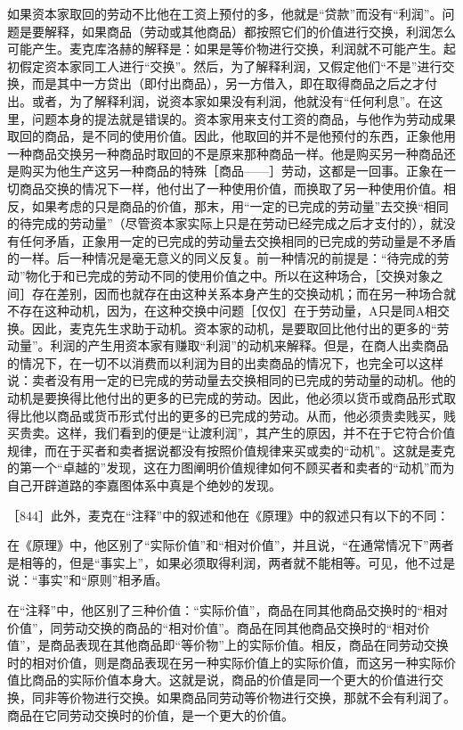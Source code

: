 如果资本家取回的劳动不比他在工资上预付的多，他就是“贷款”而没有“利润”。问题是要解释，如果商品（劳动或其他商品）都按照它们的价值进行交换，利润怎么可能产生。麦克库洛赫的解释是：如果是等价物进行交换，利润就不可能产生。起初假定资本家同工人进行“交换”。然后，为了解释利润，又假定他们“不是”进行交换，而是其中一方贷出（即付出商品），另一方借入，即在取得商品之后之才付出。或者，为了解释利润，说资本家如果没有利润，他就没有“任何利息”。在这里，问题本身的提法就是错误的。资本家用来支付工资的商品，与他作为劳动成果取回的商品，是不同的使用价值。因此，他取回的并不是他预付的东西，正象他用一种商品交换另一种商品时取回的不是原来那种商品一样。他是购买另一种商品还是购买为他生产这另一种商品的特殊［商品——］劳动，这都是一回事。正象在一切商品交换的情况下一样，他付出了一种使用价值，而换取了另一种使用价值。相反，如果考虑的只是商品的价值，那末，用“一定的已完成的劳动量”去交换“相同的待完成的劳动量”（尽管资本家实际上只是在劳动已经完成之后才支付的），就没有任何矛盾，正象用一定的已完成的劳动量去交换相同的已完成的劳动量是不矛盾的一样。后一种情况是毫无意义的同义反复。前一种情况的前提是：“待完成的劳动”物化于和已完成的劳动不同的使用价值之中。所以在这种场合，［交换对象之间］存在差别，因而也就存在由这种关系本身产生的交换动机；而在另一种场合就不存在这种动机，因为，在这种交换中问题［仅仅］在于劳动量，A只是同A相交换。因此，麦克先生求助于动机。资本家的动机，是要取回比他付出的更多的“劳动量”。利润的产生用资本家有赚取“利润”的动机来解释。但是，在商人出卖商品的情况下，在一切不以消费而以利润为目的出卖商品的情况下，也完全可以这样说：卖者没有用一定的已完成的劳动量去交换相同的已完成的劳动量的动机。他的动机是要换得比他付出的更多的已完成的劳动。因此，他必须以货币或商品形式取得比他以商品或货币形式付出的更多的已完成的劳动。从而，他必须贵卖贱买，贱买贵卖。这样，我们看到的便是“让渡利润”，其产生的原因，并不在于它符合价值规律，而在于买者和卖者据说都没有按照价值规律来买或卖的“动机”。这就是麦克的第一个“卓越的”发现，这在力图阐明价值规律如何不顾买者和卖者的“动机”而为自己开辟道路的李嘉图体系中真是个绝妙的发现。

［844］此外，麦克在“注释”中的叙述和他在《原理》中的叙述只有以下的不同：

在《原理》中，他区别了“实际价值”和“相对价值”，并且说，“在通常情况下”两者是相等的，但是“事实上”，如果必须取得利润，两者就不能相等。可见，他不过是说：“事实”和“原则”相矛盾。

在“注释”中，他区别了三种价值：“实际价值”，商品在同其他商品交换时的“相对价值”，同劳动交换的商品的“相对价值”。商品在同其他商品交换时的“相对价值”，是商品表现在其他商品即“等价物”上的实际价值。相反，商品在同劳动交换时的相对价值，则是商品表现在另一种实际价值上的实际价值，而这另一种实际价值比商品的实际价值本身大。这就是说，商品的价值是同一个更大的价值进行交换，同非等价物进行交换。如果商品同劳动等价物进行交换，那就不会有利润了。商品在它同劳动交换时的价值，是一个更大的价值。

